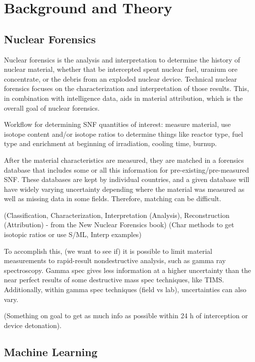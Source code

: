 \documentclass{anstrans}
\begin{document}
\section{Background and Theory}

\subsection{Nuclear Forensics}

Nuclear forensics is the analysis and interpretation to determine the history
of nuclear material, whether that be intercepted spent nuclear fuel, uranium
ore concentrate, or the debris from an exploded nuclear device. Technical
nuclear forensics focuses on the characterization and interpretation of those
results. This, in combination with intelligence data, aids in material
attribution, which is the overall goal of nuclear forensics.  

Workflow for determining SNF quantities of interest: measure material, use
isotope content and/or isotope ratios to determine things like reactor type,
fuel type and enrichment at beginning of irradiation, cooling time, burnup.

After the material characteristics are measured, they are matched in a
forensics database that includes some or all this information for
pre-existing/pre-measured SNF. These databases are kept by individual
countries, and a given database will have widely varying uncertainty depending
where the material was measured as well as missing data in some fields.
Therefore, matching can be difficult.

(Classification, Characterization, Interpretation (Analysis), Reconstruction
(Attribution) - from the New Nuclear Forensics book) (Char methods to get
isotopic ratios or use S/ML, Interp examples)

To accomplish this, (we want to see if) it is possible to limit material
measurements to rapid-result nondestructive analysis, such as gamma ray
spectroscopy. Gamma spec gives less information at a higher uncertainty than
the near perfect results of some destructive mass spec techniques, like TIMS.
Additionally, within gamma spec techniques (field vs lab), uncertainties can
also vary.

(Something on goal to get as much info as possible within 24 h of interception
or device detonation). 

\subsection{Machine Learning}
\end{document}
